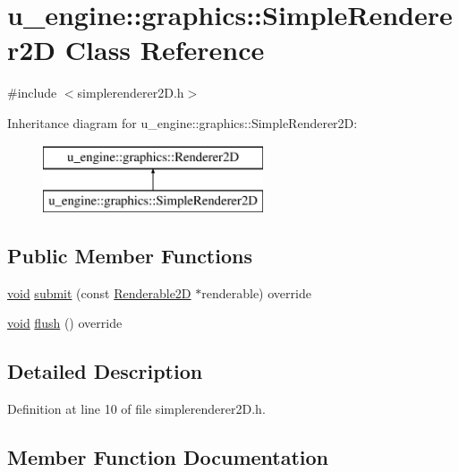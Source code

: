 \hypertarget{classu__engine_1_1graphics_1_1_simple_renderer2_d}{}\section{u\+\_\+engine\+:\+:graphics\+:\+:Simple\+Renderer2\+D Class Reference}
\label{classu__engine_1_1graphics_1_1_simple_renderer2_d}


{\ttfamily \#include $<$simplerenderer2\+D.\+h$>$}

Inheritance diagram for u\+\_\+engine\+:\+:graphics\+:\+:Simple\+Renderer2\+D\+:\begin{figure}[H]
\begin{center}
\leavevmode
\includegraphics[height=2.000000cm]{classu__engine_1_1graphics_1_1_simple_renderer2_d}
\end{center}
\end{figure}
\subsection*{Public Member Functions}
\begin{DoxyCompactItemize}
\item 
\hyperlink{wglew_8h_aeea6e3dfae3acf232096f57d2d57f084}{void} \hyperlink{classu__engine_1_1graphics_1_1_simple_renderer2_d_aa35d6472fe50af78a13680a03fe1fdcc}{submit} (const \hyperlink{classu__engine_1_1graphics_1_1_renderable2_d}{Renderable2\+D} $\ast$renderable) override
\item 
\hyperlink{wglew_8h_aeea6e3dfae3acf232096f57d2d57f084}{void} \hyperlink{classu__engine_1_1graphics_1_1_simple_renderer2_d_ac5687d3e57c732ac23b297660a351e27}{flush} () override
\end{DoxyCompactItemize}


\subsection{Detailed Description}


Definition at line 10 of file simplerenderer2\+D.\+h.



\subsection{Member Function Documentation}
\hypertarget{classu__engine_1_1graphics_1_1_simple_renderer2_d_ac5687d3e57c732ac23b297660a351e27}{}
